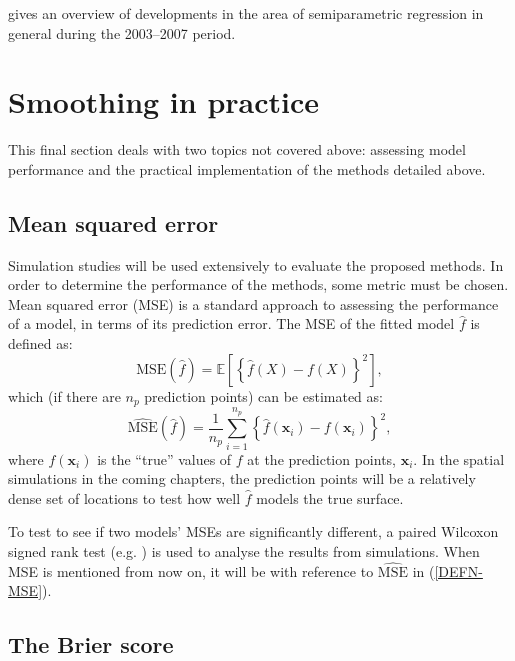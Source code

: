  gives an overview of developments in the area of semiparametric regression in general during the 2003--2007 period.

\section{Smoothing in practice}
\label{intro-inpractice}

This final section deals with two topics not covered above: assessing model performance and the practical implementation of the methods detailed above.

\subsection{Mean squared error}
\label{intro-MSE}

Simulation studies will be used extensively to evaluate the proposed methods. In order to determine the performance of the methods, some metric must be chosen. Mean squared error (MSE) is a standard approach to assessing the performance of a model, in terms of its prediction error. The MSE of the fitted model $\hat{f}$ is defined as:
\begin{equation*}
\text{MSE}(\hat{f}) = \mathbb{E}\left [\left \{ \hat{f}(X) - f(X) \right \}^2 \right ],
\end{equation*}
which (if there are $n_p$ prediction points) can be estimated as:
\begin{equation}
\widehat{\text{MSE}}(\hat{f}) = \frac{1}{n_p} \sum_{i=1}^{n_p} \left \{\hat{f}(\mathbf{x}_i) - f(\mathbf{x}_i) \right \}^2,
\label{DEFN-MSE}
\end{equation}
where $f(\mathbf{x}_i)$ is the ``true'' values of $f$ at the prediction points, $\mathbf{x}_i$. In the spatial simulations in the coming chapters, the prediction points will be a relatively dense set of locations to test how well $\hat{f}$ models the true surface. 

To test to see if two models' MSEs are significantly different, a paired Wilcoxon signed rank test (e.g. \cite[pp.173-175]{wetherill}) is used to analyse the results from simulations. When MSE is mentioned from now on, it will be with reference to $\widehat{\text{MSE}}$ in (\ref{DEFN-MSE}).

\subsection{The Brier score}
\label{DEFN-brier}


